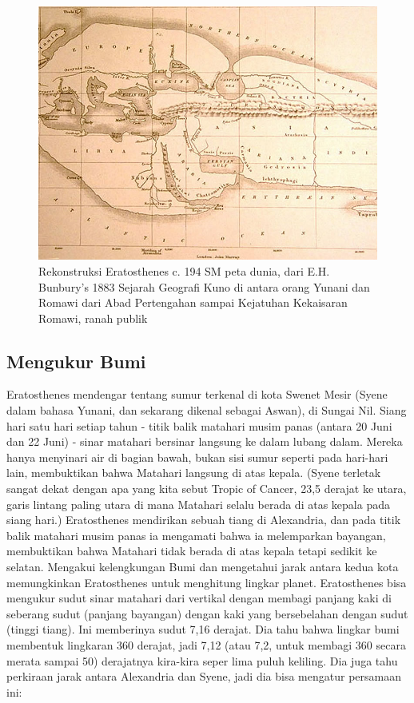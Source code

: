 \begin{figure}[ht]
	\centerline{\includegraphics[width=1\textwidth]{figures/194BCEworldmap.jpg}}
	\caption{Rekonstruksi Eratosthenes c. 194 SM peta dunia, dari E.H. Bunbury's 1883 Sejarah Geografi Kuno di antara orang Yunani dan Romawi dari Abad Pertengahan sampai Kejatuhan Kekaisaran Romawi, ranah publik}
	\label{194BCEworldmap}
	\end{figure}
\subsection{Mengukur Bumi}
Eratosthenes mendengar tentang sumur terkenal di kota Swenet Mesir (Syene dalam bahasa Yunani, dan sekarang dikenal sebagai Aswan), di Sungai Nil. Siang hari satu hari setiap tahun - titik balik matahari musim panas (antara 20 Juni dan 22 Juni) - sinar matahari bersinar langsung ke dalam lubang dalam. Mereka hanya menyinari air di bagian bawah, bukan sisi sumur seperti pada hari-hari lain, membuktikan bahwa Matahari langsung di atas kepala. (Syene terletak sangat dekat dengan apa yang kita sebut Tropic of Cancer,  23,5 derajat ke utara, garis lintang paling utara di mana Matahari selalu berada di atas kepala pada siang hari.)
Eratosthenes mendirikan sebuah tiang di Alexandria, dan pada titik balik matahari musim panas ia mengamati bahwa ia melemparkan bayangan, membuktikan bahwa Matahari tidak berada di atas kepala tetapi sedikit ke selatan. Mengakui kelengkungan Bumi dan mengetahui jarak antara kedua kota memungkinkan Eratosthenes untuk menghitung lingkar planet.
\cite{nicastro2008circumference} Eratosthenes bisa mengukur sudut sinar matahari dari vertikal dengan membagi panjang kaki di seberang sudut (panjang bayangan) dengan kaki yang bersebelahan dengan sudut (tinggi tiang). Ini memberinya sudut 7,16 derajat. Dia tahu bahwa lingkar bumi membentuk lingkaran 360 derajat, jadi 7,12 (atau 7,2, untuk membagi 360 secara merata sampai 50) derajatnya kira-kira seper lima puluh keliling. Dia juga tahu perkiraan jarak antara Alexandria dan Syene, jadi dia bisa mengatur persamaan ini:

